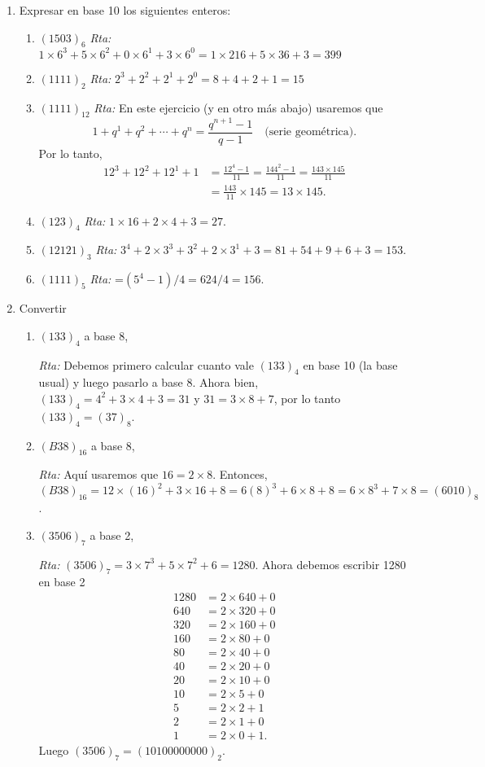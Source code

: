 \documentclass[12pt,spanish,makeidx]{amsbook}
\newcommand{\rta}{\noindent\textit{Rta: }}
\begin{document}
\begin{enumerate}
\smallskip

\item Expresar en base 10 los siguientes enteros:
\begin{enumerate}
	\item 
	$(1503)_6$  \rta  $1 \times 6^3+ 5 \times 6^2+0 \times 6^1+3 \times 6^0=1  \times 216+ 5 \times 36 +3=399$
	\item
	$(1111)_2$  \rta  $2^3+2^2+2^1+2^0= 8+4+2+1=15$
	\item
	$(1111)_{12}$  \rta  En este ejercicio (y en otro más abajo) usaremos  que 
	\begin{equation*}
		1+ q^1 +q^2 +\cdots +q^n =  \frac{q^{n+1} -1}{q-1}\quad \text{(serie geométrica)}.
	\end{equation*}
	Por lo tanto,
	\begin{align*}
		12^3+12^2+12^1+1 &=\frac{12^4-1}{11}=\frac{144^2-1}{11}=\frac{143\times145}{11}\\
		&= \frac{143}{11} \times 145  = 13 \times 145.
	\end{align*}
	 
	\item
	$(123)_4$  \rta  $1\times 16+2\times 4+3=27$.
	\item
	$(12121)_3$  \rta $3^4+2\times 3^3+3^2+2\times 3^1+3=81+54+9+6+3=153$.
	\item
	$(1111)_5$  \rta =$(5^4-1)/4=624/4 = 156$.
\end{enumerate}

\smallskip

\item Convertir
\begin{enumerate}
	\item
	$(133)_4$ a base 8,  
	
	\rta  Debemos primero calcular cuanto vale  $(133)_4$ en base 10 (la base usual) y luego pasarlo a base 8. Ahora bien, $(133)_4 = 4^2+3\times 4+3 = 31$ y $31 = 3 \times 8 + 7$, por lo tanto  $(133)_4 =  (37)_8$.
	\item
	$(B38)_{16}$ a base 8,  
	
	\rta  Aquí usaremos que $16 = 2 \times 8$. Entonces,  $(B38)_{16} = 12\times (16)^2+3\times 16+8=6(8)^3+6\times 8+8=6\times 8^3+7\times 8=(6010)_8$.
	\item
	$(3506)_7$ a base 2, 
	
	\rta  $(3506)_7 = 3\times 7^3+5\times 7^2+6= 1280$. Ahora debemos escribir 1280 en base 2
	\begin{align*}
	1280 &= 2 \times 640 + 0 \\
	640 &= 2 \times 320 + 0 \\
	320 &= 2 \times 160 + 0 \\
	160 &= 2 \times 80 + 0 \\
	80 &= 2 \times 40 + 0 \\		
	40 &= 2 \times 20 +0\\
	20 &= 2 \times 10 + 0\\
	10&= 2 \times 5+0 \\
	5&= 2 \times 2 +1 \\
	2&= 2 \times 1+ 0\\
	1 &= 2 \times 0 + 1.
	\end{align*}
	Luego $(3506)_7 = (10100000000)_2$. 
	

\end{enumerate}
\end{enumerate}
\end{document}
